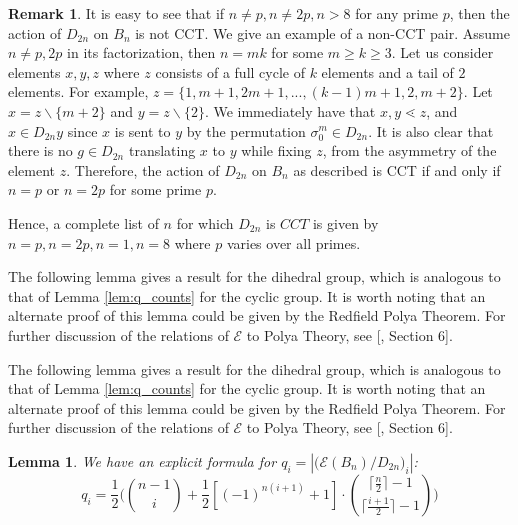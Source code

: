 \documentclass[10 pt]{amsart}
\theoremstyle{plain}
\newtheorem{lem}[thm]{Lemma}
\theoremstyle{definition}
\newtheorem{rem}[thm]{Remark}
\theoremstyle{remark}
\numberwithin{equation}{section}
\begin{document}
\begin{rem}
\label{prop:iff_dihedral_cct}
It is easy to see that if $n \neq p,n \neq 2p, n >8$ for any prime $p$, then the action of $D_{2n}$ on $B_n$ is not CCT. We give an example of a non-CCT pair. Assume $n \ne p, 2 p$ in its factorization, then $n = mk$ for some $m \ge k \ge 3$. Let us consider elements $x, y, z$ where $z$ consists of a full cycle of $k$ elements and a tail of $2$ elements. For example, $z = \{1, m+1, 2m+1, ..., (k-1)m+1, 2, m+2\}$. Let $x = z \backslash \{m+2\}$ and $y = z \backslash \{2\}$. We immediately have that $x, y \lessdot z$, and $x \in D_{2n} y$ since $x$ is sent to $y$ by the permutation $\sigma_0^m \in D_{2n}$. It is also clear that there is no $g \in D_{2n}$ translating $x$ to $y$ while fixing $z$, from the asymmetry of the element $z$. Therefore, the action of $D_{2n}$ on $B_n$ as described is CCT if and only if $n =p$ or $n = 2p$ for some prime $p$.

Hence, a complete list of $n$ for which $D_{2n}$ is $CCT$ is given by $n = p,n = 2p, n = 1, n = 8$ where $p$ varies over all primes.
\end{rem}


The following lemma gives a result for the dihedral group, which is analogous to that of Lemma \ref{lem:q_counts} for the cyclic group. It is worth noting that an alternate proof of this lemma could be given by the Redfield Polya Theorem. For further discussion of the relations of $\mathcal E$ to Polya Theory, see [\cite{reu_report}, Section 6].

The following lemma gives a result for the dihedral group, which is analogous to that of Lemma \ref{lem:q_counts} for the cyclic group. It is worth noting that an alternate proof of this lemma could be given by the Redfield Polya Theorem. For further discussion of the relations of $\mathcal E$ to Polya Theory, see [\cite{reu_report}, Section 6].

\begin{lem}{\label{dihedral002}}
 We have an explicit formula for $q_i = |\big(\mathcal E (B_n)/D_{2n} \big)_i|$:
 $$q_i = \frac{1}{2} \Big( {n-1 \choose i } + \frac{1}{2} [(-1)^{n(i+1)}+1] \cdot { \lceil \frac n 2\rceil -1  \choose \lceil \frac{i+1} 2 \rceil - 1}  \Big)$$
\end{lem}
\end{document}
